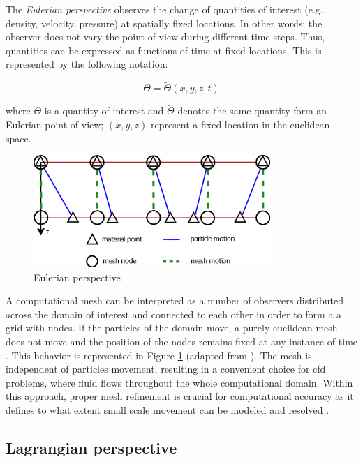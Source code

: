 The \textit{Eulerian perspective} observes the change of quantities of interest (e.g. density, velocity, pressure) at spatially fixed locations. In other words: the observer does not vary the point of view during different time steps. Thus, quantities can be expressed as functions of time at fixed locations. 
This is represented by the following notation:

\begin{equation}
	\Theta = \tilde{\Theta}(x,y,z,t)
	\label{eq:eulerian}
\end{equation}

where $\Theta$ is a quantity of interest and $\tilde{\Theta}$ denotes the same quantity form an Eulerian point of view; $(x, y, z)$ represent a fixed location in the euclidean space.


\begin{figure}[htbp!]
	\centering
	\includegraphics[width=0.8\textwidth]{images/eulerian}
	\caption{Eulerian perspective}
	\label{fig:eulerian}
\end{figure}

A computational mesh can be interpreted as a number of observers distributed across the domain of interest and connected to each other in order to form a a grid with nodes. If the particles of the domain move, a purely euclidean mesh does not move and the position of the nodes remains fixed at any instance of time \cite{Cheng2006SlidingFL}. 
This behavior is represented in Figure \ref{fig:eulerian} (adapted from \cite{Cheng2006SlidingFL}). The mesh is independent of particles movement, resulting in a convenient choice for \acrfull{cfd} problems, where fluid flows throughout the whole
computational domain. Within this approach, proper mesh refinement is crucial for computational accuracy as it defines to what extent small scale movement can be modeled and resolved \cite{donea2017arbitrary}.

\subsection{Lagrangian perspective}
\label{subsec:lagrange}

